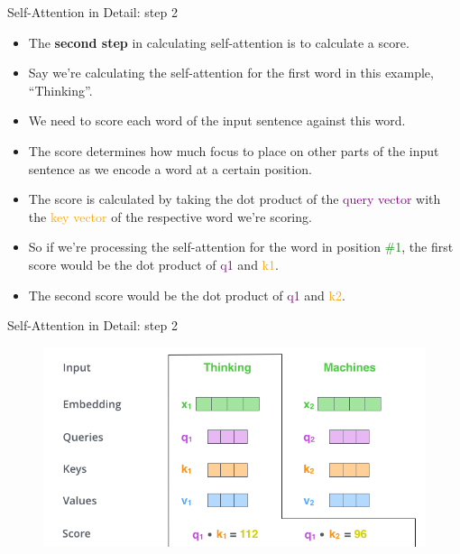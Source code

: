 \documentclass[handout]{beamer}
\begin{document}
\begin{frame}{Self-Attention in Detail: step 2}
\begin{scriptsize}



\begin{itemize}


\item The \textbf{second step} in calculating self-attention is to calculate a score. 

\item Say we’re calculating the self-attention for the first word in this example, ``Thinking''.

\item We need to score each word of the input sentence against this word. 

\item The score determines how much focus to place on other parts of the input sentence as we encode a word at a certain position.

\item The score is calculated by taking the dot product of the \textcolor{purple}{query vector} with the \textcolor{orange}{key vector} of the respective word we're scoring. 
\item So if we're processing the self-attention for the word in position \textcolor{green}{\#1}, the first score would be the dot product of \textcolor{purple}{q1} and \textcolor{orange}{k1}.
\item The second score would be the dot product of \textcolor{purple}{q1} and \textcolor{orange}{k2}.

\end{itemize}

\end{scriptsize}


\end{frame}


\begin{frame}{Self-Attention in Detail: step 2}


\begin{figure}[h]
        	\includegraphics[scale = 0.4]{pics/transformer_self_attention_score.png}
        \end{figure} 




\end{frame}
\end{document}
